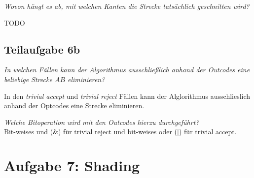 \documentclass[a4paper]{scrartcl}
\begin{document}
\textit{Wovon hängt es ab, mit welchen Kanten die Strecke tatsächlich
geschnitten wird?}

TODO

\subsection*{Teilaufgabe 6b}

\textit{In welchen Fällen kann der Algorithmus ausschließlich anhand der Outcodes eine
beliebige Strecke $\overline{AB}$ eliminieren?}

In den \textit{trivial accept} und \textit{trivial reject} Fällen kann der
Alglorithmus ausschlieslich anhand der Optcodes eine Strecke eliminieren.

\textit{Welche Bitoperation wird mit den Outcodes hierzu durchgeführt?}\\

Bit-weises und (\&) für trivial reject und bit-weises oder ($|$) für trivial
accept.


\section*{Aufgabe 7: Shading}
\end{document}
